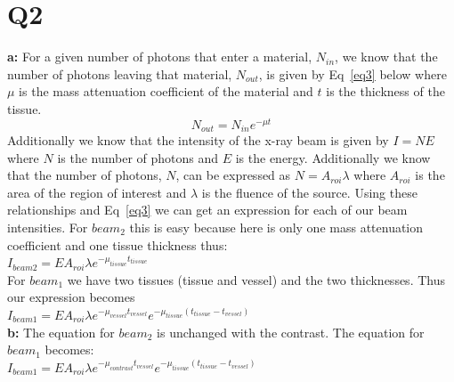 \documentclass[12pt]{article}
\begin{document}
\section{Q2}
\noindent\textbf{a: } 
For a given number of photons that enter a material, $N_{in}$, we know that the number of photons leaving that material, $N_{out}$, is given by Eq~\ref{eq3} below where $\mu$ is the mass attenuation coefficient of the material and $t$ is the thickness of the tissue.
 \begin{equation}
 N_{out} = N_{in}e^{-\mu t}
 \label{eq3}
 \end{equation}
\noindent Additionally we know that the intensity of the x-ray beam is given by $I = NE$ where $N$ is the number of photons and $E$ is the energy. Additionally we know that the number of photons, $N$, can be expressed as $N = A_{roi}\lambda$ where $A_{roi}$ is the area of the region of interest and $\lambda$ is the fluence of the source. Using these relationships and Eq~\ref{eq3} we can get an expression for each of our beam intensities. For $beam_2$ this is easy because here is only one mass attenuation coefficient and one tissue thickness thus:\\ $I_{beam2} = EA_{roi}\lambda e^{-\mu_{tissue}t_{tissue}}$\\ For $beam_1$ we have two tissues (tissue and vessel) and the two thicknesses. Thus our expression becomes \\$I_{beam1} =EA_{roi}\lambda e^{-\mu_{vessel}t_{vessel}}e^{-\mu_{tissue}(t_{tissue}-t_{vessel})}$\\

\noindent\textbf{b: }
The equation for $beam_2$ is unchanged with the contrast. The equation for $beam_1$ becomes:\\
$I_{beam1} =EA_{roi}\lambda e^{-\mu_{contrast}t_{vessel}}e^{-\mu_{tissue}(t_{tissue}-t_{vessel})}$\\
\end{document}
